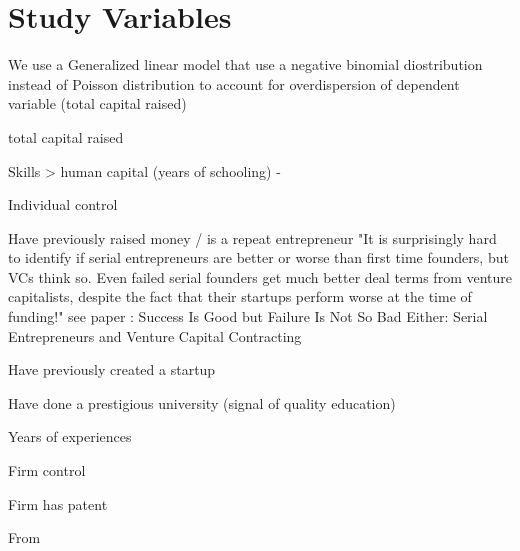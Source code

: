 \documentclass[11pt]{article}
\begin{document}
\section{Study Variables}

We use a Generalized linear model that use a negative binomial diostribution instead of Poisson distribution to account for overdispersion of dependent variable (total capital raised)

total capital raised

Skills > human capital (years of schooling) - \citet{hanushek2016will}

Individual control

Have previously raised money / is a repeat entrepreneur "It is surprisingly hard to identify if serial entrepreneurs are better or worse than first time founders, but VCs think so. Even failed serial founders get much better deal terms from venture capitalists, despite the fact that their startups perform worse at the time of funding!" see paper : Success Is Good but Failure Is Not So Bad Either: Serial Entrepreneurs and Venture Capital Contracting

Have previously created a startup

Have done a prestigious university (signal of quality education)

Years of experiences

Firm control

Firm has patent



\clearpage

From




\end{document}

